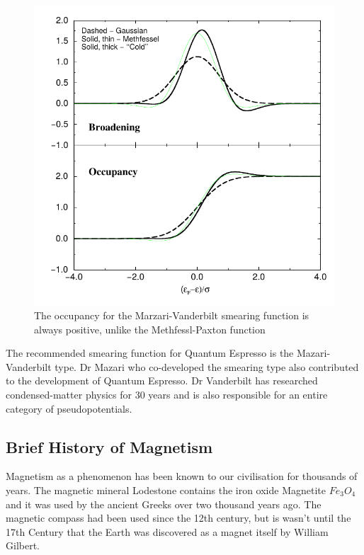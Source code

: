 \begin{figure}
\centering
\begin{minipage}{.65\textwidth}
\centering
    \includegraphics[width=.75\linewidth]{chapters/interatomic_potential_fitting/images/marzarismearing.png}
    \caption{The occupancy for the Marzari-Vanderbilt smearing function is always positive, unlike the Methfessl-Paxton function\cite{marzarithesis2}}
    \label{fig:marzarimethfessel}
\end{minipage}
\end{figure}

The recommended smearing function for Quantum Espresso is the Mazari-Vanderbilt type.  Dr Mazari
who co-developed the smearing type also contributed to the development of Quantum Espresso.  Dr Vanderbilt has researched condensed-matter physics for 30 years and is also responsible for an entire category of pseudopotentials.



\FloatBarrier
\subsection{Brief History of Magnetism}

Magnetism as a phenomenon has been known to our civilisation for thousands of years.  The magnetic mineral Lodestone contains the iron oxide Magnetite $Fe_3 O_4$ and it was used by the ancient Greeks over two thousand years ago.  The magnetic compass had been used since the 12th century, but is wasn't until the 17th Century that the Earth was discovered as a magnet itself by William Gilbert.


